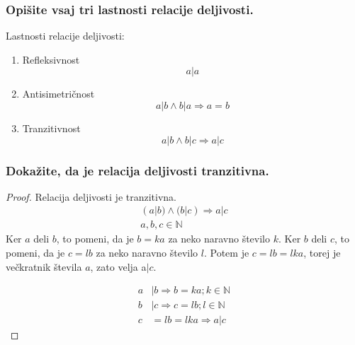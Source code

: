 \documentclass{article}
\begin{document}
\subsubsection*{Opišite vsaj tri lastnosti relacije deljivosti.}

Lastnosti relacije deljivosti:


\begin{enumerate}
    \item Refleksivnost
    \begin{equation*}
        a | a
    \end{equation*}

    \item Antisimetričnost
    \begin{equation*}
        a | b \land b | a \Rightarrow a = b
    \end{equation*}

    \item Tranzitivnost
    \begin{equation*}
        a | b \land b | c \Rightarrow a | c
    \end{equation*}

\end{enumerate}



\subsubsection*{Dokažite, da je relacija deljivosti tranzitivna.}
\begin{proof}
    Relacija deljivosti je tranzitivna. 
    \begin{gather*}
    (a | b) \land (b | c) \Rightarrow a | c \\
    a, b, c \in \mathbb{N}
    \end{gather*}
    Ker $a$ deli $b$, to pomeni, da je $b=ka$ za neko naravno število $k$. Ker $b$ deli $c$, to pomeni, da je $c=lb$ za neko naravno število $l$. Potem je $c = lb = lka$, torej je večkratnik števila $a$, zato velja a$|c$.

\begin{align*}
    a &| b \Rightarrow b=ka; k \in \mathbb{N} \\
    b &| c \Rightarrow c = lb; l \in \mathbb{N} \\
    c &= lb = lka \Rightarrow a | c
\end{align*}

\end{proof}
\end{document}
